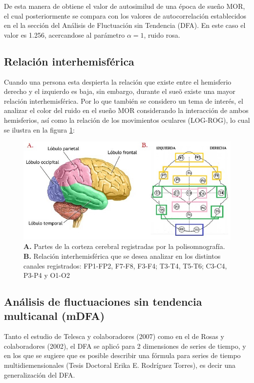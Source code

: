 \documentclass[letterpaper,titlepage,12pt,draft]{report}
\begin{document}
De esta manera de obtiene el valor de autosimilud de una \'epoca de sue\~no MOR, el cual posteriormente se compara con los valores de autocorrelaci\'on establecidos en el la secci\'on del An\'alisis de Fluctuaci\'on sin Tendencia (DFA). En este caso el valor es 1.256, acercandose al par\'ametro $\alpha=1$, ruido rosa. 

\subsection{Relaci\'on interhemisf\'erica}

Cuando una persona esta despierta la relaci\'on que existe entre el hemisferio derecho y el izquierdo es baja, sin embargo, durante el sue\~o existe una mayor relaci\'on interhemisf\'erica. Por lo que tambi\'en se considero un tema de inter\'es, el analizar el color del ruido en el sue\~no MOR considerando la interacci\'on de ambos hemisferios, as\'i como la relaci\'on de los movimientos oculares (LOG-ROG), lo cual se ilustra en la figura \ref{fig:rel}:

\begin{figure}[H]
\centering
\includegraphics[scale=0.7]{rel.jpg}
\caption{{\bf A.} Partes de la corteza cerebral registradas por la polisomnograf\'ia. {\bf B.} Relaci\'on interhemisf\'erica que se desea analizar en los distintos canales registrados: FP1-FP2, F7-F8, F3-F4; T3-T4, T5-T6; C3-C4, P3-P4 y O1-O2}
\label{fig:rel}
\end{figure}


\subsection{An\'alisis de fluctuaciones sin tendencia multicanal (mDFA)} 

Tanto el estudio de Telesca y colaboradores (2007) como en el de Rosas y colaboradores (2002), el DFA se aplic\'o para 2 dimensiones de series de tiempo, y en los que se sugiere que es posible describir una f\'ormula para series de tiempo multidiemensionales (Tesis Doctoral Erika E. Rodr\'iguez Torres), es decir una generalizaci\'on del DFA.\\
\end{document}
